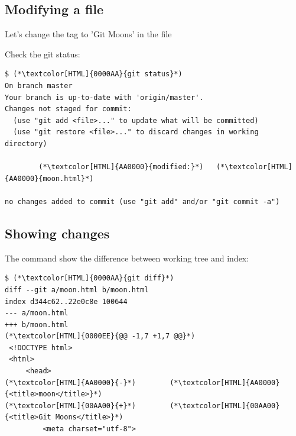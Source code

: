 \subsection{Modifying a file}
\begin{frame}[fragile]
  \subslidetitle

  Let's change the  tag to 'Git Moons' in the  file

  Check the git status:
  \begin{lstlisting}
$ (*\textcolor[HTML]{0000AA}{git status}*)
On branch master
Your branch is up-to-date with 'origin/master'.
Changes not staged for commit:
  (use "git add <file>..." to update what will be committed)
  (use "git restore <file>..." to discard changes in working directory)

        (*\textcolor[HTML]{AA0000}{modified:}*)   (*\textcolor[HTML]{AA0000}{moon.html}*)

no changes added to commit (use "git add" and/or "git commit -a")
\end{lstlisting}
\end{frame}

\subsection{Showing changes}
\begin{frame}[fragile]
  \subslidetitle

  The command  show the difference between working tree and index:
  \begin{lstlisting}
$ (*\textcolor[HTML]{0000AA}{git diff}*)
diff --git a/moon.html b/moon.html
index d344c62..22e0c8e 100644
--- a/moon.html
+++ b/moon.html
(*\textcolor[HTML]{0000EE}{@@ -1,7 +1,7 @@}*)
 <!DOCTYPE html>
 <html>
     <head>
(*\textcolor[HTML]{AA0000}{-}*)        (*\textcolor[HTML]{AA0000}{<title>moon</title>}*)
(*\textcolor[HTML]{00AA00}{+}*)        (*\textcolor[HTML]{00AA00}{<title>Git Moons</title>}*)
         <meta charset="utf-8">
\end{lstlisting}
\end{frame}

